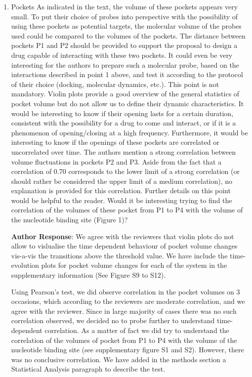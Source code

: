 \documentclass[11pt, a4paper]{article}
\begin{document}
\begin{enumerate}
    \item Pockets
    As indicated in the text, the volume of these pockets appears very small. To put their choice of probes into perspective with the possibility of using these pockets as potential targets, the molecular volume of the probes used could be compared to the volumes of the pockets. The distance between pockets P1 and P2 should be provided to support the proposal to design a drug capable of interacting with these two pockets. It could even be very interesting for the authors to prepare such a molecular probe, based on the interactions described in point 1 above, and test it according to the protocol of their choice (docking, molecular dynamics, etc.). This point is not mandatory.
    Violin plots provide a good overview of the general statistics of pocket volume but do not allow us to define their dynamic characteristics. It would be interesting to know if their opening lasts for a certain duration, consistent with the possibility for a drug to come and interact, or if it is a phenomenon of opening/closing at a high frequency. Furthermore, it would be interesting to know if the openings of these pockets are correlated or uncorrelated over time.
    The authors mention a strong correlation between volume fluctuations in pockets P2 and P3. Aside from the fact that a correlation of 0.70 corresponds to the lower limit of a strong correlation (or should rather be considered the upper limit of a medium correlation), no explanation is provided for this correlation. Further details on this point would be helpful to the reader.
    Would it be interesting trying to find the correlation of the volumes of these pocket from P1 to P4 with the volume of the nucleotide binding site (Figure 1)?

    \textbf{Author Response}: We agree with the reviewers that violin plots do not allow to vislualise the time dependent behaviour of pocket volume changes vis-a-vis the transitions above the threshold value. We have include the time-evolution plots for pocket volume changes for each of the system in the supplementary information (See Figure S9 to S12). 
    
    Using Pearson's test, we did observe correlation in the pocket volumes on 3 occasions, which according to the reviewers are moderate correlation, and we agree with the reviewer. Since in large majority of cases there was no such correlation observed, we decided no to probe further to understand time-dependent correlation. 
    As a matter of fact we did try to understand  the correlation of the volumes of pocket from P1 to P4 with the volume of the nucleotide binding site (see supplementary figure S1 and S2). However, there was no conclusive correlation.
    We have added in the methods section a Statistical Analysis paragraph to describe the test.




\end{enumerate}
\end{document}
